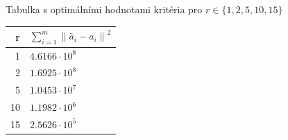 \documentclass[10pt,a4paper,openright]{article}
\newcommand{\norm}[1]{\left\lVert#1\right\rVert}
\begin{document}
\subsection{}
\begin{center}
Tabulka s optimálními hodnotami kritéria pro $r \in \{1,2,5,10,15\}$\\
\begin{tabular}{|r|l|}
    \hline
    r & $\sum_{i=1}^{m} \norm{\tilde{a_i} - a_i}^2$ \\
    \hline \hline
    1 & $4.6166 \cdot 10^8$ \\
    2 & $1.6925 \cdot 10^8$ \\
    5 & $1.0453 \cdot 10^7$\\
    10 & $1.1982 \cdot 10^6$\\
    15 & $2.5626 \cdot 10^5$\\
    \hline
\end{tabular}
\end{center}
\end{document}
